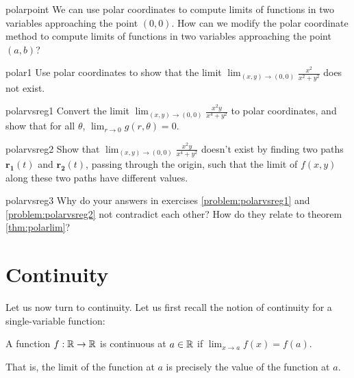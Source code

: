 \begin{problem}{polarpoint}
    We can use polar coordinates to compute limits of functions in two variables approaching the point $(0,0)$.  How can we modify the polar coordinate method to compute limits of functions in two variables approaching the point $(a,b)$?
\end{problem}

\begin{problem}{polar1}
    Use polar coordinates to show that the limit $\lim_{(x,y) \to (0,0)} \frac{x^2}{x^2+y^2}$ does not exist.
\end{problem}

\begin{problem}{polarvsreg1}
    Convert the limit $\lim_{(x,y) \to (0,0)} \frac{x^2y}{x^4+y^2}$ to polar coordinates, and show that for all $\theta$, $\lim_{r\to0} g(r, \theta) = 0$.
\end{problem}

\begin{problem}{polarvsreg2}
    Show that $\lim_{(x,y) \to (0,0)} \frac{x^2y}{x^4+y^2}$ doesn't exist by finding two paths $\bm{r_1}(t)$ and $\bm{r_2}(t)$, passing through the origin, such that the limit of $f(x,y)$ along these two paths have different values.  
\end{problem}

\begin{problem}{polarvsreg3}
    Why do your answers in exercises \ref{problem:polarvsreg1} and \ref{problem:polarvsreg2} not contradict each other?  How do they relate to theorem \ref{thm:polarlim}?

\end{problem}


\section{Continuity}\label{sec:continuity}

Let us now turn to continuity.  Let us first recall the notion of continuity for a single-variable function:


\begin{definition}
    A function $f :\mathbb{R} \to \mathbb{R}$ is continuous at $a \in \mathbb{R}$ if $\lim_{x \to a}f(x) = f(a)$.
    
    \end{definition}

That is, the limit of the function at $a$ is precisely the value of the function at $a$.



